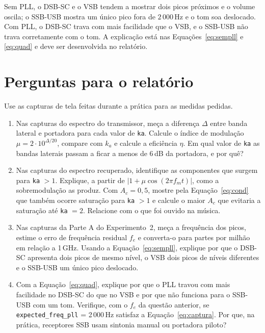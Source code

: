 \documentclass[11pt,a4paper]{article}
\begin{document}
\begin{atencao}
      Sem PLL, o DSB-SC e o VSB tendem a mostrar dois picos próximos e o volume oscila; o
      SSB-USB mostra um único pico fora de $2\,000$\,Hz e o tom soa deslocado. Com
      PLL, o DSB-SC trava com mais facilidade que o VSB, e o SSB-USB não trava
      corretamente com o tom. A explicação está nas
      Equações~\eqref{eq:sempll} e \eqref{eq:quad} e deve ser desenvolvida no
      relatório.
\end{atencao}

\section{Perguntas para o relatório}

Use as capturas de tela feitas durante a prática para as medidas pedidas.

\begin{enumerate}[label=\textbf{Q\arabic*.}, leftmargin=*]

      \item Nas capturas do espectro do transmissor, meça a diferença $\Delta$ entre
            banda lateral e portadora para cada valor de \texttt{ka}. Calcule o
            índice de modulação $\mu = 2\cdot 10^{\Delta/20}$, compare com $k_a$ e
            calcule a eficiência $\eta$. Em qual valor de \texttt{ka} as bandas
            laterais passam a ficar a menos de 6\,dB da portadora, e por quê?

      \item Nas capturas do espectro recuperado, identifique as componentes que
            surgem para \texttt{ka} $> 1$. Explique, a partir de
            $|1 + \mu\cos(2\pi f_m t)|$, como a sobremodulação as produz. Com
            $A_c = 0{,}5$, mostre pela Equação~\eqref{eq:cond} que também ocorre
            saturação para \texttt{ka} $> 1$ e calcule o maior $A_c$ que evitaria a
            saturação até \texttt{ka} $= 2$. Relacione com o que foi ouvido na
            música.

      \item Nas capturas da Parte A do Experimento~2, meça a frequência dos picos,
            estime o erro de frequência residual $f_e$ e converta-o para partes por
            milhão em relação a 1\,GHz. Usando a Equação~\eqref{eq:sempll}, explique
            por que o DSB-SC apresenta dois picos de mesmo nível, o VSB dois picos de
            níveis diferentes e o SSB-USB um único pico deslocado.

      \item Com a Equação~\eqref{eq:quad}, explique por que o PLL travou com mais
            facilidade no DSB-SC do que no VSB e por que não funciona para o SSB-USB
            com um tom. Verifique, com o $f_e$ da questão anterior, se
            \texttt{expected\_freq\_pll} = 2\,000\,Hz satisfaz a
            Equação~\eqref{eq:captura}. Por que, na prática, receptores SSB usam
            sintonia manual ou portadora piloto?

\end{enumerate}
\end{document}
